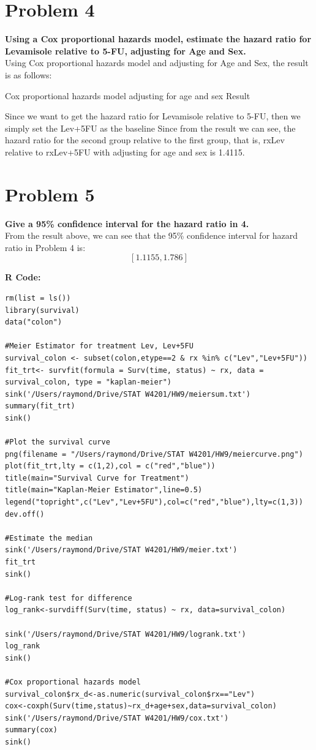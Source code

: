 \documentclass[10pt,letterpaper]{article}
\begin{document}
\section*{Problem 4}
\textbf{Using a Cox proportional hazards model, estimate the hazard ratio for Levamisole relative to 5-FU, adjusting for Age and Sex.}\\

Using Cox proportional hazards model and adjusting for Age and Sex, the result is as follows:
\begin{center}
\small{Cox proportional hazards model adjusting for age and sex Result}
\end{center}
Since we want to get the hazard ratio for Levamisole relative to 5-FU, then we simply set the Lev+5FU as the baseline
Since from the result we can see, the hazard ratio for the second group relative to the first group, that is, rxLev relative to rxLev+5FU with adjusting for age and sex is 1.4115.
\section*{Problem 5}
\textbf{Give a 95\% confidence interval for the hazard ratio in 4.}\\

From the result above, we can see that the 95\% confidence interval for hazard ratio in Problem 4 is: \[[1.1155 , 1.786]\] 

\newpage
\textbf{R Code:}
\begin{lstlisting}
rm(list = ls())
library(survival)
data("colon")

#Meier Estimator for treatment Lev, Lev+5FU
survival_colon <- subset(colon,etype==2 & rx %in% c("Lev","Lev+5FU"))
fit_trt<- survfit(formula = Surv(time, status) ~ rx, data = survival_colon, type = "kaplan-meier")
sink('/Users/raymond/Drive/STAT W4201/HW9/meiersum.txt')
summary(fit_trt)
sink()

#Plot the survival curve
png(filename = "/Users/raymond/Drive/STAT W4201/HW9/meiercurve.png")
plot(fit_trt,lty = c(1,2),col = c("red","blue"))
title(main="Survival Curve for Treatment")
title(main="Kaplan-Meier Estimator",line=0.5)
legend("topright",c("Lev","Lev+5FU"),col=c("red","blue"),lty=c(1,3))
dev.off()

#Estimate the median
sink('/Users/raymond/Drive/STAT W4201/HW9/meier.txt')
fit_trt
sink()

#Log-rank test for difference
log_rank<-survdiff(Surv(time, status) ~ rx, data=survival_colon)

sink('/Users/raymond/Drive/STAT W4201/HW9/logrank.txt')
log_rank
sink()

#Cox proportional hazards model
survival_colon$rx_d<-as.numeric(survival_colon$rx=="Lev")
cox<-coxph(Surv(time,status)~rx_d+age+sex,data=survival_colon)
sink('/Users/raymond/Drive/STAT W4201/HW9/cox.txt')
summary(cox)
sink()

\end{lstlisting}
\end{document}
